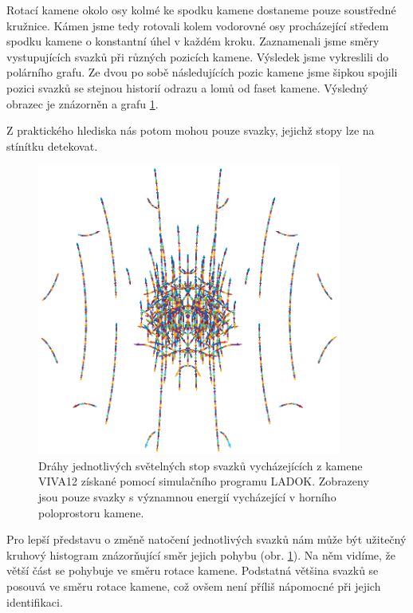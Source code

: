 Rotací kamene okolo osy kolmé ke spodku kamene dostaneme pouze soustředné kružnice. Kámen jsme tedy rotovali kolem vodorovné osy procházející středem spodku kamene o konstantní úhel v každém kroku. Zaznamenali jsme směry vystupujících svazků při různých pozicích kamene. Výsledek jsme vykreslili do polárního grafu. Ze dvou po sobě následujících pozic kamene jsme šipkou spojili pozici svazků se stejnou historií odrazu a lomů od faset kamene. Výsledný obrazec je znázorněn a grafu \ref{fig:relativni pohyb graf}.

Z praktického hlediska nás potom mohou pouze svazky, jejichž stopy lze na stínítku detekovat.

\begin{figure}[h!]
\begin{center}
\includegraphics[width = 10cm]{figures/viva12_bigflux.eps}
\end{center}
\caption{Dráhy jednotlivých světelných stop svazků vycházejících z kamene VIVA12 získané pomocí simulačního programu  LADOK. Zobrazeny jsou pouze svazky s významnou energií vycházející v horního poloprostoru kamene. }

\label{fig:relativni pohyb graf}
\end{figure}

Pro lepší představu o změně natočení jednotlivých svazků nám může být užitečný kruhový histogram znázorňující směr jejich pohybu (obr. \ref{fig:relativni pohyb graf}). Na něm vidíme, že větší část se pohybuje ve směru rotace kamene. Podstatná většina svazků se posouvá ve směru rotace kamene, což ovšem není příliš nápomocné při jejich identifikaci.

